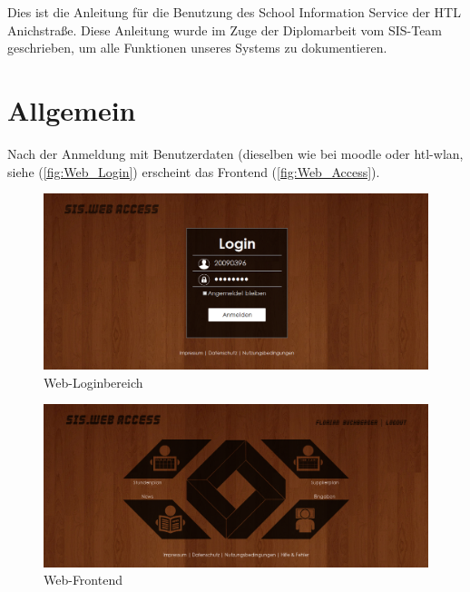 Dies ist die Anleitung für die Benutzung des School Information Service der HTL Anichstraße. Diese Anleitung wurde im Zuge der Diplomarbeit vom SIS-Team geschrieben, um alle Funktionen unseres Systems zu dokumentieren.

\section{Allgemein}
Nach der Anmeldung mit Benutzerdaten (dieselben wie bei moodle oder htl-wlan, siehe (\autoref{fig:Web_Login}) erscheint das Frontend (\autoref{fig:Web_Access}). \\

\begin{figure}[H]
\centering
\includegraphics[keepaspectratio=true, width=14cm]{images/screenshots/login.png}
\caption{Web-Loginbereich}
\label{fig:Web_Login}
\end{figure}

\begin{figure}[H]
\centering
\includegraphics[keepaspectratio=true, width=14cm]{images/screenshots/web-access_nohover.png}
\caption{Web-Frontend}
\label{fig:Web_Access}
\end{figure}

